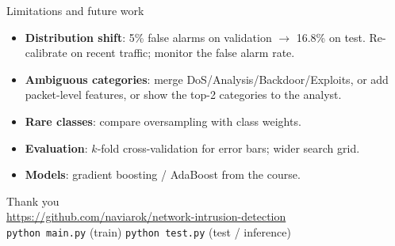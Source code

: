 \documentclass[aspectratio=169,11pt]{beamer}
\begin{document}
\begin{frame}{Limitations and future work}
\begin{itemize}
\item \textbf{Distribution shift}: 5\% false alarms on validation $\to$ 16.8\% on test.
Re-calibrate on recent traffic; monitor the false alarm rate.
\item \textbf{Ambiguous categories}: merge DoS/Analysis/Backdoor/Exploits, or add packet-level
features, or show the top-2 categories to the analyst.
\item \textbf{Rare classes}: compare oversampling with class weights.
\item \textbf{Evaluation}: $k$-fold cross-validation for error bars; wider search grid.
\item \textbf{Models}: gradient boosting / AdaBoost from the course.
\end{itemize}
\vspace{6pt}
\centering{}
\end{frame}

\begin{frame}
\centering\Large Thank you\\[8pt]
\normalsize \url{https://github.com/naviarok/network-intrusion-detection}\\[6pt]
\texttt{python main.py} (train) \quad \texttt{python test.py} (test / inference)
\end{frame}
\end{document}
